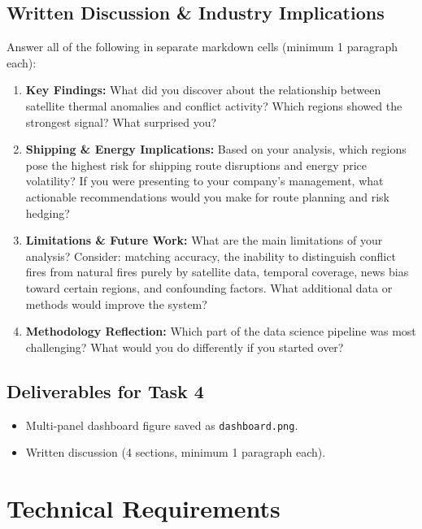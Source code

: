 \documentclass[11pt]{article}
\begin{document}
\subsection{Written Discussion \& Industry Implications}
Answer all of the following in separate markdown cells (minimum 1 paragraph each):
\begin{enumerate}
  \item \textbf{Key Findings:} What did you discover about the relationship between satellite thermal anomalies and conflict activity? Which regions showed the strongest signal? What surprised you?
  \item \textbf{Shipping \& Energy Implications:} Based on your analysis, which regions pose the highest risk for shipping route disruptions and energy price volatility? If you were presenting to your company's management, what actionable recommendations would you make for route planning and risk hedging?
  \item \textbf{Limitations \& Future Work:} What are the main limitations of your analysis? Consider: matching accuracy, the inability to distinguish conflict fires from natural fires purely by satellite data, temporal coverage, news bias toward certain regions, and confounding factors. What additional data or methods would improve the system?
  \item \textbf{Methodology Reflection:} Which part of the data science pipeline was most challenging? What would you do differently if you started over?
\end{enumerate}

\subsection{Deliverables for Task 4}
\begin{itemize}
  \item Multi-panel dashboard figure saved as \texttt{dashboard.png}.
  \item Written discussion (4 sections, minimum 1 paragraph each).
\end{itemize}

\section{Technical Requirements}
\end{document}
